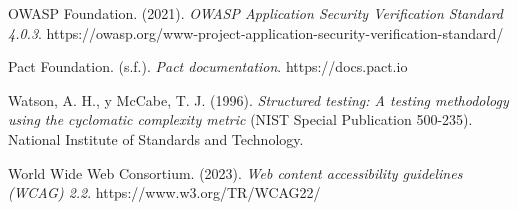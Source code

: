 \documentclass[anexo]{../../comun/overfore}
\begin{document}
\begin{referencias}
\item OWASP Foundation. (2021). \emph{OWASP Application Security Verification Standard 4.0.3}. https://owasp.org/www-project-application-security-verification-standard/
\item Pact Foundation. (s.f.). \emph{Pact documentation}. https://docs.pact.io
\item Watson, A. H., y McCabe, T. J. (1996). \emph{Structured testing: A testing methodology using the cyclomatic complexity metric} (NIST Special Publication 500-235). National Institute of Standards and Technology.
\item World Wide Web Consortium. (2023). \emph{Web content accessibility guidelines (WCAG) 2.2}. https://www.w3.org/TR/WCAG22/
\end{referencias}
\end{document}
